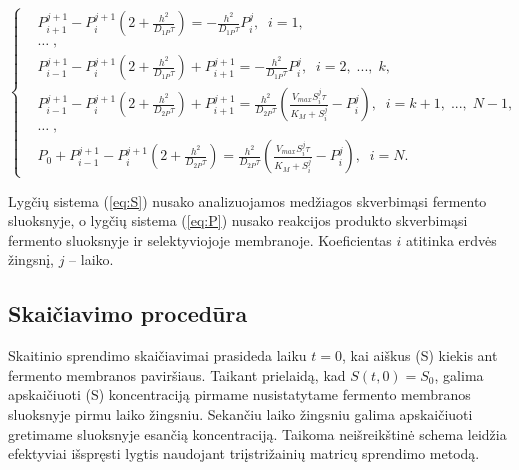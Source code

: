 \documentclass[12pt, a4paper, lithuanian]{article}
\begin{document}
\begin{equation}\label{eq:P}
\left\{
\begin{aligned}
    &P_{i+1}^{j+1}-P_i^{j+1}\left(2+\frac{h^2}{D_{1P}\tau}\right)
    = -\frac{h^2}{D_{1P}\tau} P_i^j,\; \; i = 1,\\
    &\dots\;,\\
    &P_{i-1}^{j+1}-P_i^{j+1}\left(2+\frac{h^2}{D_{1P}\tau}\right)+P_{i+1}^{j+1}
    =-\frac{h^2}{D_{1P}\tau} P_i^j,\; \; i = 2,\;...,\;k,\\
    &P_{i-1}^{j+1}-P_i^{j+1}\left(2+\frac{h^2}{D_{2P}\tau}\right)+P_{i+1}^{j+1}
    = \frac{h^2}{D_{2P}\tau}
    \left(\frac{V_{max}S_i^j\tau}{K_M+S_i^j}-P_i^j\right),\; \; i =
        k +1,\;...,\;N-1,\\
    &\dots\;,\\
    &P_0 + P_{i-1}^{j+1} - P_i^{j+1}\left(2+\frac{h^2}{D_{2P}\tau}\right)
        =  \frac{h^2}{D_{2P}\tau}
        \left(\frac{V_{max}S_i^j\tau}{K_M+S_i^j}-P_i^j\right),\; \; i = N.
\end{aligned}
\right.
\end{equation}

Lygčių sistema (\ref{eq:S}) nusako analizuojamos medžiagos skverbimąsi fermento
sluoksnyje, o lygčių sistema (\ref{eq:P}) nusako reakcijos produkto skverbimąsi
fermento sluoksnyje ir selektyviojoje membranoje. Koeficientas $i$ atitinka
erdvės žingsnį, $j$ – laiko.

\subsection{Skaičiavimo procedūra}

Skaitinio sprendimo skaičiavimai prasideda laiku $t = 0$,
kai aiškus (S) kiekis ant fermento membranos paviršiaus. Taikant prielaidą, kad
$S(t, 0) = S_0$, galima apskaičiuoti (S) koncentraciją pirmame nusistatytame fermento
membranos sluoksnyje pirmu laiko žingsniu. Sekančiu laiko žingsniu galima
apskaičiuoti gretimame sluoksnyje esančią koncentraciją. Taikoma neišreikštinė
schema leidžia efektyviai išspręsti lygtis naudojant triįstrižainių matricų
sprendimo metodą.
\end{document}
